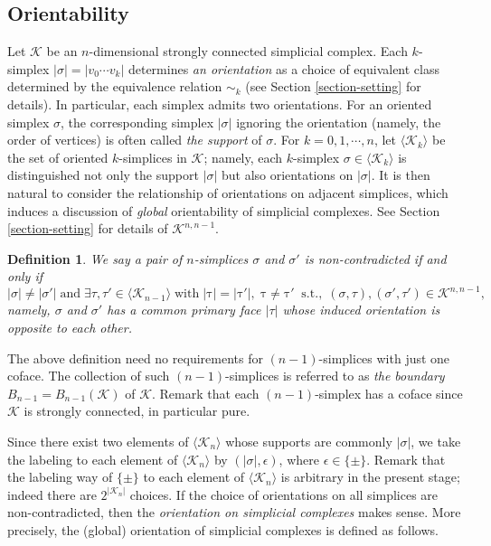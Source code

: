 \documentclass[a4paper,12pt]{article}
\newtheorem{definition}{Definition}[section]
\newcommand{\bra}{\langle}
\newcommand{\ket}{\rangle}
\numberwithin{equation}{section}
\begin{document}
\subsection{Orientability}
\label{section-orientability}
Let $\mathcal{K}$ be an $n$-dimensional strongly connected simplicial complex. 
Each $k$-simplex $|\sigma| = |v_0 \cdots v_k|$ determines {\em an orientation} as a choice of equivalent class determined by the equivalence relation $\sim_k$ (see Section \ref{section-setting} for details).
In particular, each simplex admits two orientations.
For an oriented simplex $\sigma$, the corresponding simplex $|\sigma|$ ignoring the orientation (namely, the order of vertices) is often called {\em the support } of $\sigma$.
For $k=0,1,\cdots, n$, let $\langle \mathcal{K}_k \rangle$ be the set of oriented $k$-simplices in $\mathcal{K}$; namely, each $k$-simplex $\sigma\in \langle \mathcal{K}_k \rangle$ is distinguished not only the support $|\sigma|$ but also orientations on $|\sigma|$.
%
It is then natural to consider the relationship of orientations on adjacent simplices, which induces a discussion of {\em global} orientability of simplicial complexes.
See Section \ref{section-setting} for details of $\mathcal{K}^{n,n-1}$.

\begin{definition}\rm
We say a pair of $n$-simplices $\sigma$ and $\sigma'$ is {\em non-contradicted} if and only if 
\begin{equation*}
 |\sigma|\neq |\sigma'| \mathrm{\;and\;} \exists \tau,\tau'\in \bra \mathcal{K}_{n-1} \ket 
\mathrm{\;with\;|\tau|=|\tau'|,\;\tau\neq \tau'\;}
\mathrm{\;s.t.,\;} 
(\sigma,\tau),(\sigma',\tau')\in \mathcal{K}^{n,n-1},
\end{equation*}
namely, $\sigma$ and $\sigma'$ has a common primary face $|\tau|$ whose induced orientation is opposite to each other.
\end{definition}
The above definition need no requirements for $(n-1)$-simplices with just one coface.
The collection of such $(n-1)$-simplices is referred to as {\em the boundary} $B_{n-1} = B_{n-1}(\mathcal{K})$ of $\mathcal{K}$.
Remark that each $(n-1)$-simplex has a coface since $\mathcal{K}$ is strongly connected, in particular pure.
\par
Since there exist two elements of $\bra \mathcal{K}_n \ket$ whose supports are commonly $|\sigma|$, 
we take the labeling to each element of $\bra \mathcal{K}_n \ket$ by $(|\sigma|,\epsilon)$, where $\epsilon\in \{\pm \}$. 
Remark that the labeling way of $\{\pm \}$ to each element of $\bra \mathcal{K}_n \ket$ is arbitrary in the present stage; indeed there are $2^{|\mathcal{K}_n|}$ choices. 
If the choice of orientations on all simplices are non-contradicted, then the {\em orientation on simplicial complexes} makes sense.
More precisely, the (global) orientation of simplicial complexes is defined as follows.
\end{document}
